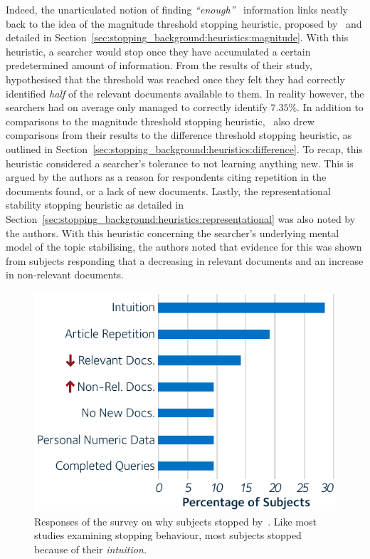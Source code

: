 Indeed, the unarticulated notion of finding \emph{``enough''}~\citep{zach2005enough_is_enough} information links neatly back to the idea of the magnitude threshold stopping heuristic, proposed by~\cite{nickles1995judgment} and detailed in Section~\ref{sec:stopping_background:heuristics:magnitude}. With this heuristic, a searcher would stop once they have accumulated a certain predetermined amount of information. From the results of their study,~\cite{dostert2009satisficing} hypothesised that the threshold was reached once they felt they had correctly identified \emph{half} of the relevant documents available to them. In reality however, the searchers had on average only managed to correctly identify $7.35\%$. In addition to comparisons to the magnitude threshold stopping heuristic,~\cite{dostert2009satisficing} also drew comparisons from their results to the difference threshold stopping heuristic, as outlined in Section~\ref{sec:stopping_background:heuristics:difference}. To recap, this heuristic considered a searcher's tolerance to not learning anything new. This is argued by the authors as a reason for respondents citing repetition in the documents found, or a lack of new documents. Lastly, the representational stability stopping heuristic as detailed in Section~\ref{sec:stopping_background:heuristics:representational} was also noted by the authors. With this heuristic concerning the searcher's underlying mental model of the topic stabilising, the authors noted that evidence for this was shown from subjects responding that a decreasing in relevant documents and an increase in non-relevant documents.

\begin{figure}
    \begin{center}
    \vspace*{-10mm}
    \includegraphics[width=1\textwidth]{figures/ch3-respondents.pdf}
    \end{center}
    \vspace*{-4mm}
    \caption[Responses of a survey by~\cite{dostert2009satisficing}]{Responses of the survey on why subjects stopped by~\cite{dostert2009satisficing}. Like most studies examining stopping behaviour, most subjects stopped because of their \emph{intuition.}}
    \label{fig:stopping_respondents}
\end{figure}

